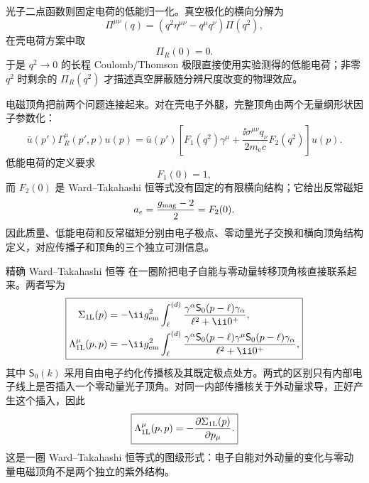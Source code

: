 光子二点函数则固定电荷的低能归一化。真空极化的横向分解为
\begin{equation*}
\Pi^{\mu\nu}(q)
=(q^2\eta^{\mu\nu}-q^\mu q^\nu)\Pi(q^2),
\end{equation*}
在壳电荷方案中取
\begin{equation}
\boxed{\Pi_R(0)=0.}
\label{eq:qed-onshell-vacpol-condition-dp53}
\end{equation}
于是 \(q^2\to0\) 的长程 Coulomb/Thomson 极限直接使用实验测得的低能电荷；非零 \(q^2\) 时剩余的 \(\Pi_R(q^2)\) 才描述真空屏蔽随分辨尺度改变的物理效应。

电磁顶角把前两个问题连接起来。对在壳电子外腿，完整顶角由两个无量纲形状因子参数化：
\begin{equation*}
\bar u(p')\Gamma_R^\mu(p',p)u(p)
=\bar u(p')\left[
F_1(q^2)\gamma^\mu
+\frac{\ii\sigma^{\mu\nu}q_\nu}{2m_{\mathrm e} c}F_2(q^2)
\right]u(p).
\end{equation*}
低能电荷的定义要求
\begin{equation}
\boxed{F_1(0)=1,}
\label{eq:qed-F1-charge-normalization-dp53}
\end{equation}
而 \(F_2(0)\) 是 Ward--Takahashi 恒等式没有固定的有限横向结构；它给出反常磁矩
\begin{equation*}
a_e=\frac{g_{\rm mag}-2}{2}=F_2(0).
\end{equation*}
因此质量、低能电荷和反常磁矩分别由电子极点、零动量光子交换和横向顶角结构定义，对应传播子和顶角的三个独立可测信息。

精确 Ward--Takahashi 恒等 在一圈阶把电子自能与零动量转移顶角核直接联系起来。两者写为
\begin{equation}
\boxed{
\begin{aligned}
\Sigma_{\rm 1L}(p)
&=-\ii g_{\rm em}^2
\int_{\ell}^{(d)}
\frac{\gamma^\alpha\mathsf S_0(p-\ell)\gamma_\alpha}
{\ell^2+\ii0^+},\\
\Lambda_{\rm 1L}^{\mu}(p,p)
&=-\ii g_{\rm em}^2
\int_{\ell}^{(d)}
\frac{\gamma^\alpha\mathsf S_0(p-\ell)\gamma^\mu
\mathsf S_0(p-\ell)\gamma_\alpha}
{\ell^2+\ii0^+},
\end{aligned}}
\label{eq:qed-one-loop-selfenergy-vertex-kernels-dp68}
\end{equation}
其中 \(\mathsf S_0(k)\) 采用自由电子约化传播核及其既定极点处方。两式的区别只有内部电子线上是否插入一个零动量光子顶角。对同一内部传播核关于外动量求导，正好产生这个插入，因此
\begin{equation}
\boxed{
\Lambda_{\rm 1L}^{\mu}(p,p)
=-\frac{\partial\Sigma_{\rm 1L}(p)}{\partial p_\mu}.}
\label{eq:qed-one-loop-ward-kernel-dp53}
\end{equation}
这是一圈 Ward--Takahashi 恒等式的图级形式：电子自能对外动量的变化与零动量电磁顶角不是两个独立的紫外结构。

